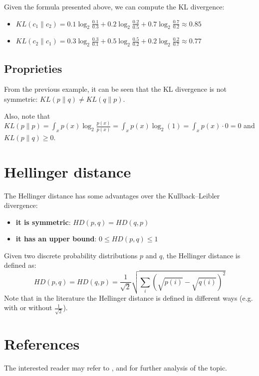 Given the formula presented above, we can compute the KL divergence:
\begin{itemize}
    \item $\mathit{KL}(c_1 \| c_2) = 0.1 \log_2 \frac{0.1}{0.3} + 0.2 \log_2 \frac{0.2}{0.5} + 0.7 \log_2 \frac{0.7}{0.2} \approx 0.85$
    \item $\mathit{KL}(c_2 \| c_1) = 0.3 \log_2 \frac{0.3}{0.1} + 0.5 \log_2 \frac{0.5}{0.2} + 0.2 \log_2 \frac{0.2}{0.7} \approx 0.77$
\end{itemize}


\subsection{Proprieties}
From the previous example, it can be seen that the KL divergence is not symmetric: $\mathit{KL}(p \| q) \neq \mathit{KL}(q \| p)$.

Also, note that $\mathit{KL}(p \| p) = \int_x p(x) \log_2 \frac{p(x)}{p(x)} = \int_x p(x) \log_2 (1) = \int_x p(x) \cdot 0 = 0$
and $\mathit{KL}(p \| q) \geq 0$.

\section{Hellinger distance} \label{hd}
The Hellinger distance has some advantages over the Kullback–Leibler divergence:
\begin{itemize}
    \item \textbf{it is symmetric}: $\mathit{HD}(p, q) = \mathit{HD}(q, p)$
    \item \textbf{it has an upper bound}: $0 \leq \mathit{HD}(p, q) \leq 1$
\end{itemize}

Given two discrete probability distributions $p$ and $q$, the Hellinger distance is defined as:
\[\mathit{HD}(p, q) = \mathit{HD}(q, p) = \frac{1}{\sqrt{2}} \sqrt{\sum_i (\sqrt{p(i)} - \sqrt{q(i)})^2}\]
Note that in the literature the Hellinger distance is defined in different ways (e.g. with or without $\frac{1}{\sqrt{2}}$).

\section{References}
The interested reader may refer to \cite{Joyce2011}, \cite{61115} and \cite{Hellinger1909} for further analysis of the topic.